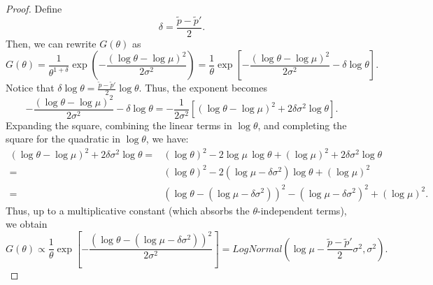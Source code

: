 \begin{proof}
Define
\[
\delta = \frac{\tilde{p}-\tilde{p}'}{2}.
\]
Then, we can rewrite \(G(\theta)\) as
\[
G(\theta) = \frac{1}{\theta^{1+\delta}}\exp\left(-\frac{(\log \theta - \log \mu)^2}{2\sigma^2}\right)
= \frac{1}{\theta}\exp\left[-\frac{(\log \theta - \log \mu)^2}{2\sigma^2} - \delta \log \theta\right].
\]
Notice that \(\delta \log \theta = \frac{\tilde{p}-\tilde{p}'}{2}\log \theta\). %
Thus, the exponent becomes
\[
-\frac{(\log \theta - \log \mu)^2}{2\sigma^2} - \delta \log \theta 
= -\frac{1}{2\sigma^2}\left[(\log \theta - \log \mu)^2 + 2\delta\sigma^2\log \theta\right].
\]
Expanding the square, combining the linear terms in \(\log \theta\), and completing the square for the quadratic in \(\log \theta\), we have: 
\begin{align*}
(\log \theta - \log \mu)^2 + 2\delta\sigma^2\log \theta 
= & (\log \theta)^2 - 2\log \mu\,\log \theta + (\log \mu)^2 + 2\delta\sigma^2\log \theta \\
= &(\log \theta)^2 - 2\left(\log \mu - \delta\sigma^2\right)\log \theta + (\log \mu)^2 \\
= & \left(\log \theta - \left(\log \mu - \delta\sigma^2\right)\right)^2 - \left(\log \mu - \delta\sigma^2\right)^2 + (\log \mu)^2.
\end{align*}
Thus, up to a multiplicative constant (which absorbs the \(\theta\)-independent terms), we obtain
\[
G(\theta) \propto \frac{1}{\theta}\exp\left[-\frac{\left(\log \theta - \left(\log \mu - \delta\sigma^2\right)\right)^2}{2\sigma^2}\right] = LogNormal\left(\log\mu - \frac{\tilde{p}-\tilde{p}'}{2}\sigma^2, \sigma^2\right).
\]
\end{proof}

